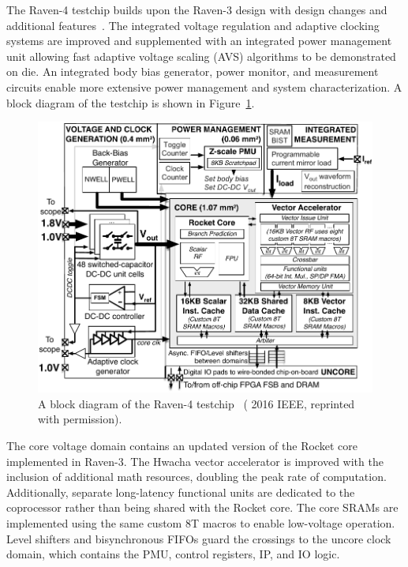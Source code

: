 \documentclass[graybox]{svmult}
\begin{document}
The Raven-4 testchip builds upon the Raven-3 design with design changes and additional features~\cite{Keller2017}.
The integrated voltage regulation and adaptive clocking systems are improved and supplemented with an integrated power management unit allowing fast adaptive voltage scaling (AVS) algorithms to be demonstrated on die.
An integrated body bias generator, power monitor, and measurement circuits enable more extensive power management and system characterization.
A block diagram of the testchip is shown in Figure~\ref{fig:6-raven4-blockdiagram}.

\begin{figure}
  \centering
  \includegraphics[width=\textwidth]{6-raven4-blockdiagram}
  \caption{A block diagram of the Raven-4 testchip~\cite{Keller2016} ({\textcopyright} 2016 IEEE, reprinted with permission).}
  \label{fig:6-raven4-blockdiagram}
\end{figure}

The core voltage domain contains an updated version of the Rocket core implemented in Raven-3.
The Hwacha vector accelerator is improved with the inclusion of additional math resources, doubling the peak rate of computation.
Additionally, separate long-latency functional units are dedicated to the coprocessor rather than being shared with the Rocket core.
The core SRAMs are implemented using the same custom 8T macros to enable low-voltage operation.
Level shifters and bisynchronous FIFOs guard the crossings to the uncore clock domain, which contains the PMU, control registers, IP, and IO logic.
\end{document}

